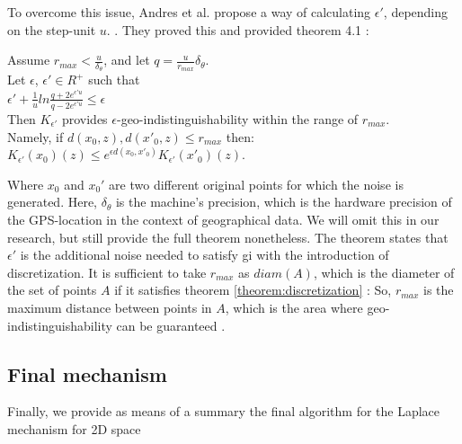 To overcome this issue, Andres et al. propose a way of calculating $\epsilon'$, depending on the step-unit $u$. \citep{DBLP:journals/corr/abs-1212-1984}.
They proved this and provided theorem 4.1 \citep{DBLP:journals/corr/abs-1212-1984}:
\begin{theorem}
  Assume $r_{max} < \frac{u}{\delta_{\theta}}$, and let $q = \frac{u}{r_{max}}\delta_{\theta}$. \\ Let $\epsilon$, $\epsilon' \in R^+$ such that \\
  $\epsilon' + \frac{1}{u}ln \frac{q + 2 e^{\epsilon'u}}{q - 2 e^{\epsilon'u}} \leq \epsilon$ \\
Then $K_{\epsilon'}$ provides $\epsilon$-geo-indistinguishability within the range of $r_{max}$. \\ 
  Namely, if ${d(x_0, z), d(x'_0, z) \leq r_{max}}$ then: \\
  $K_{\epsilon'}(x_0)(z) \leq e^{\epsilon d(x_0, x'_{0})} K_{\epsilon'}(x'_{0})(z)$.
  \label{theorem:discretization}
\end{theorem}
Where $x_0$ and $x_0'$ are two different original points for which the noise is generated. 
Here, $\delta_{\theta}$ is the machine's precision, which is the hardware precision of the GPS-location in the context of geographical data. We will omit this in our research, but still provide the full theorem nonetheless.
The theorem states that $\epsilon'$ is the additional noise needed to satisfy \gls{gi} with the introduction of discretization.
It is sufficient to take $r_{max}$ as $diam(A)$, which is the diameter of the set of points $A$ if it satisfies theorem \ref{theorem:discretization} \citep{DBLP:journals/corr/abs-1212-1984}:
So, $r_{max}$ is the maximum distance between points in $A$, which is the area where geo-indistinguishability can be guaranteed \citep{9646489}.
\newpage
\subsection{Final mechanism}
Finally, we provide as means of a summary the final algorithm for the Laplace mechanism for 2D space

\newpage